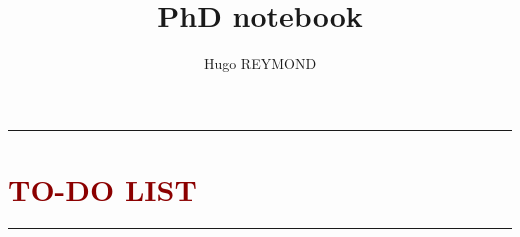 \documentclass{article}
\begin{document}
	
	\title{PhD notebook}
	\author{Hugo REYMOND}
	\date{}  %
	
	
	\maketitle %
	\thispagestyle{fancy}
	
	
	
	\tableofcontents\thispagestyle{fancy}
	
	
	\newpage





\todo{$\succ$ --------------------}


\todo{$\succ$ --------------------}


\todo{$\succ$ --------------------}










\newpage

\begin{center} \textcolor{red}{\rule{\textwidth}{0.5pt}} \end{center}


\section*{\textcolor{DarkRed}{TO-DO LIST}}
\vspace{-5mm}
\listoftodos[]
\vspace{3mm}
\begin{center} \textcolor{red}{\rule{\textwidth}{0.5pt}} \end{center}











% 
%   
% 

\printbibliography



















\end{document}
